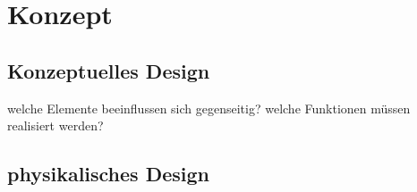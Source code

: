 \chapter{Konzept}
\label{sec:Konzept}





\section{Konzeptuelles Design}
welche Elemente beeinflussen sich gegenseitig?
welche Funktionen müssen realisiert werden?

\section{physikalisches Design}